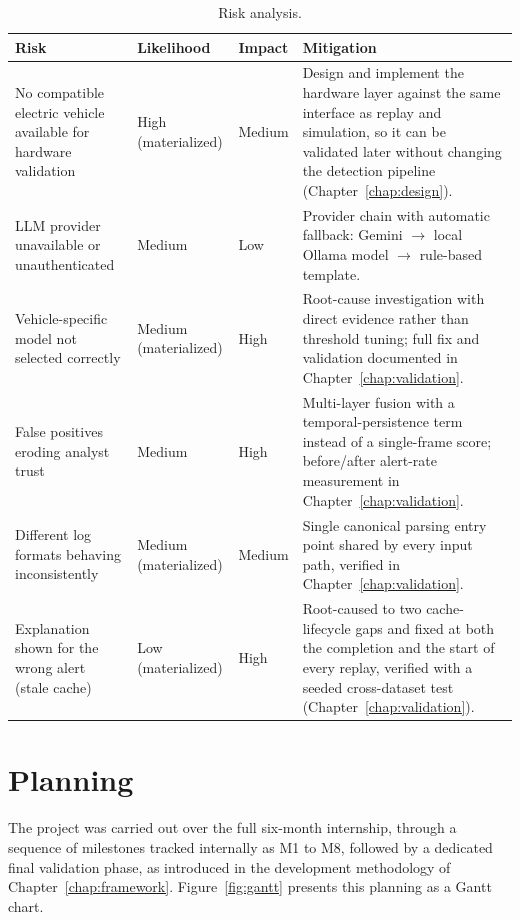 \begin{table}[H]
\centering
\caption{Risk analysis.}
\label{tab:risks}
\begin{tabular}{|p{3.3cm}|p{2.7cm}|p{1.7cm}|p{6.5cm}|}
\hline
\textbf{Risk} & \textbf{Likelihood} & \textbf{Impact} & \textbf{Mitigation} \\
\hline
No compatible electric vehicle available for hardware validation & High (materialized) & Medium & Design and implement the hardware layer against the same interface as replay and simulation, so it can be validated later without changing the detection pipeline (Chapter~\ref{chap:design}). \\
\hline
LLM provider unavailable or unauthenticated & Medium & Low & Provider chain with automatic fallback: Gemini $\rightarrow$ local Ollama model $\rightarrow$ rule-based template. \\
\hline
Vehicle-specific model not selected correctly & Medium (materialized) & High & Root-cause investigation with direct evidence rather than threshold tuning; full fix and validation documented in Chapter~\ref{chap:validation}. \\
\hline
False positives eroding analyst trust & Medium & High & Multi-layer fusion with a temporal-persistence term instead of a single-frame score; before/after alert-rate measurement in Chapter~\ref{chap:validation}. \\
\hline
Different log formats behaving inconsistently & Medium (materialized) & Medium & Single canonical parsing entry point shared by every input path, verified in Chapter~\ref{chap:validation}. \\
\hline
Explanation shown for the wrong alert (stale cache) & Low (materialized) & High & Root-caused to two cache-lifecycle gaps and fixed at both the completion and the start of every replay, verified with a seeded cross-dataset test (Chapter~\ref{chap:validation}). \\
\hline
\end{tabular}
\end{table}

\section{Planning}

The project was carried out over the full six-month internship, through a sequence of milestones tracked internally as M1 to M8, followed by a dedicated final validation phase, as introduced in the development methodology of Chapter~\ref{chap:framework}. Figure~\ref{fig:gantt} presents this planning as a Gantt chart. 

